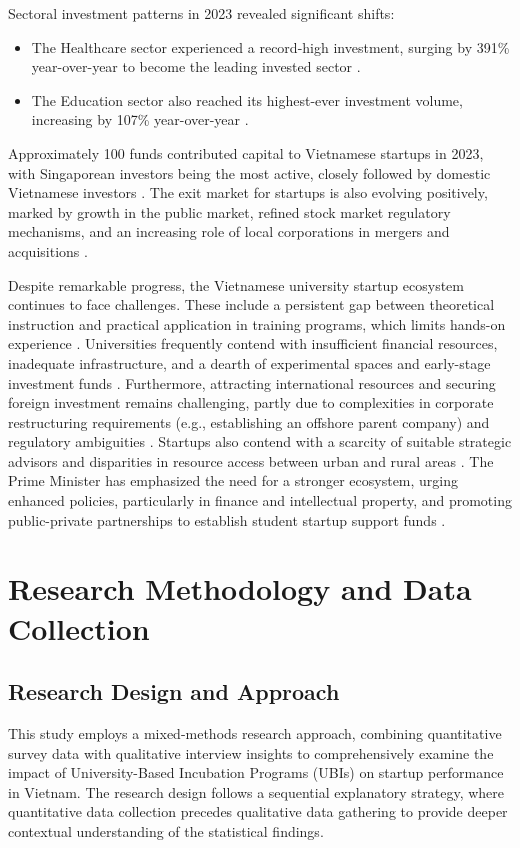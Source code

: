 \documentclass[../Main.tex]{subfiles}%
\begin{document}
	Sectoral investment patterns in 2023 revealed significant shifts:
	\begin{itemize}
	\item The Healthcare sector experienced a record-high investment, surging by 391\% year-over-year to become the leading invested sector \cite{vietnam_innovation_report_2024}.
	\item The Education sector also reached its highest-ever investment volume, increasing by 107\% year-over-year \cite{vietnam_innovation_report_2024}.
	\end{itemize}
	Approximately 100 funds contributed capital to Vietnamese startups in 2023, with Singaporean investors being the most active, closely followed by domestic Vietnamese investors \cite{vietnam_innovation_report_2024}. The exit market for startups is also evolving positively, marked by growth in the public market, refined stock market regulatory mechanisms, and an increasing role of local corporations in mergers and acquisitions \cite{vietnam_innovation_report_2024}.

	Despite remarkable progress, the Vietnamese university startup ecosystem continues to face challenges. These include a persistent gap between theoretical instruction and practical application in training programs, which limits hands-on experience \cite{nhandan2025startup}. Universities frequently contend with insufficient financial resources, inadequate infrastructure, and a dearth of experimental spaces and early-stage investment funds \cite{nhandan2025startup}. Furthermore, attracting international resources and securing foreign investment remains challenging, partly due to complexities in corporate restructuring requirements (e.g., establishing an offshore parent company) and regulatory ambiguities \cite{bssc2025wave, nssc2024challenges}. Startups also contend with a scarcity of suitable strategic advisors and disparities in resource access between urban and rural areas \cite{ueh2024vc}. The Prime Minister has emphasized the need for a stronger ecosystem, urging enhanced policies, particularly in finance and intellectual property, and promoting public-private partnerships to establish student startup support funds \cite{vietnamnews2025pm}.

	\section{Research Methodology and Data Collection}
	
	\subsection{Research Design and Approach}
	This study employs a mixed-methods research approach, combining quantitative survey data with qualitative interview insights to comprehensively examine the impact of University-Based Incubation Programs (UBIs) on startup performance in Vietnam. The research design follows a sequential explanatory strategy, where quantitative data collection precedes qualitative data gathering to provide deeper contextual understanding of the statistical findings.
	
\end{document}
